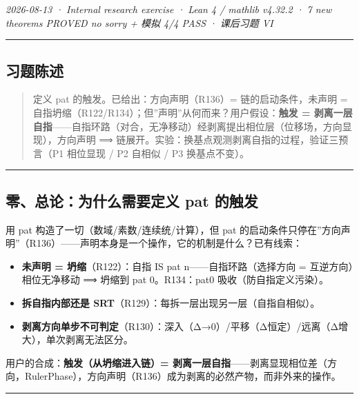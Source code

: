 \documentclass[
]{article}
\providecommand{\tightlist}{%
 \setlength{\itemsep}{0pt}\setlength{\parskip}{0pt}}
\begin{document}
\emph{2026-08-13 · Internal research exercise · Lean 4 / mathlib v4.32.2
· 7 new theorems PROVED no sorry + 模拟 4/4 PASS ·
课后习题 VI }

\begin{center}\rule{0.5\linewidth}{0.5pt}\end{center}

\subsection{习题陈述}\label{ux4e60ux9898ux9648ux8ff0}

\begin{quote}
定义 pat 的触发。已给出：方向声明（R136）= 链的启动条件，未声明 =
自指坍缩（R122/R134）；但''声明''从何而来？用户假设：\textbf{触发 =
剥离一层自指}------自指环路（对合，无净移动）经剥离提出相位层（位移场，方向显现），方向声明
⟹ 链展开。实验：换基点观测剥离自指的过程，验证三预言（P1 相位显现 / P2
自相似 / P3 换基点不变）。
\end{quote}

\begin{center}\rule{0.5\linewidth}{0.5pt}\end{center}

\subsection{零、总论：为什么需要定义 pat
的触发}\label{ux96f6ux603bux8bbaux4e3aux4ec0ux4e48ux9700ux8981ux5b9aux4e49-pat-ux7684ux89e6ux53d1}

用 pat 构造了一切（数域/素数/连续统/计算），但 pat
的启动条件只停在''方向声明''（R136）------声明本身是一个操作，它的机制是什么？已有线索：

\begin{itemize}
\tightlist
\item
 \textbf{未声明 = 坍缩}（R122）：自指 IS pat n------自指环路（选择方向
 = 互逆方向）相位无净移动 ⟹ 坍缩到 pat 0。R134：pat0
 吸收（防自指定义污染）。
\item
 \textbf{拆自指内部还是
 SRT}（R129）：每拆一层出现另一层（自指自相似）。
\item
 \textbf{剥离方向单步不可判定}（R130）：深入（Δ→0）/平移（Δ恒定）/远离（Δ增大），单次剥离无法区分。
\end{itemize}

用户的合成：\textbf{触发（从坍缩进入链）=
剥离一层自指}------剥离显现相位差（方向，RulerPhase），方向声明（R136）成为剥离的必然产物，而非外来的操作。

\begin{center}\rule{0.5\linewidth}{0.5pt}\end{center}
\end{document}
